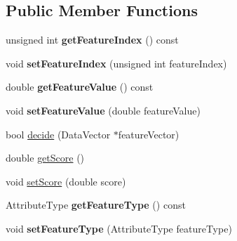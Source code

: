 \subsection*{Public Member Functions}
\begin{DoxyCompactItemize}
\item 
\hypertarget{classffactory_1_1_binary_split_a14f42275da38adef19a4e8427f2f0973}{unsigned int {\bfseries get\-Feature\-Index} () const }\label{classffactory_1_1_binary_split_a14f42275da38adef19a4e8427f2f0973}

\item 
\hypertarget{classffactory_1_1_binary_split_a3d43e118b0fde08f33c0afc8fb3e49e1}{void {\bfseries set\-Feature\-Index} (unsigned int feature\-Index)}\label{classffactory_1_1_binary_split_a3d43e118b0fde08f33c0afc8fb3e49e1}

\item 
\hypertarget{classffactory_1_1_binary_split_ae53e23f8dfc47a400948a7fc4bf4efce}{double {\bfseries get\-Feature\-Value} () const }\label{classffactory_1_1_binary_split_ae53e23f8dfc47a400948a7fc4bf4efce}

\item 
\hypertarget{classffactory_1_1_binary_split_a8926e9153314fd9cb1e6503183138143}{void {\bfseries set\-Feature\-Value} (double feature\-Value)}\label{classffactory_1_1_binary_split_a8926e9153314fd9cb1e6503183138143}

\item 
bool \hyperlink{classffactory_1_1_binary_split_a62bca13d9f4e5f796b776125acdc4072}{decide} (Data\-Vector $\ast$feature\-Vector)
\item 
double \hyperlink{classffactory_1_1_binary_split_a5baf70825250efd379c3894567669507}{get\-Score} ()
\item 
void \hyperlink{classffactory_1_1_binary_split_aac5dcfdcf09394dc8f9acf7bd0d74ee6}{set\-Score} (double score)
\item 
\hypertarget{classffactory_1_1_binary_split_ab6a6b527cd16f536d630622b4702b668}{Attribute\-Type {\bfseries get\-Feature\-Type} () const }\label{classffactory_1_1_binary_split_ab6a6b527cd16f536d630622b4702b668}

\item 
\hypertarget{classffactory_1_1_binary_split_a662bb99767628549a0101d8dfd557b5c}{void {\bfseries set\-Feature\-Type} (Attribute\-Type feature\-Type)}\label{classffactory_1_1_binary_split_a662bb99767628549a0101d8dfd557b5c}

\end{DoxyCompactItemize}


